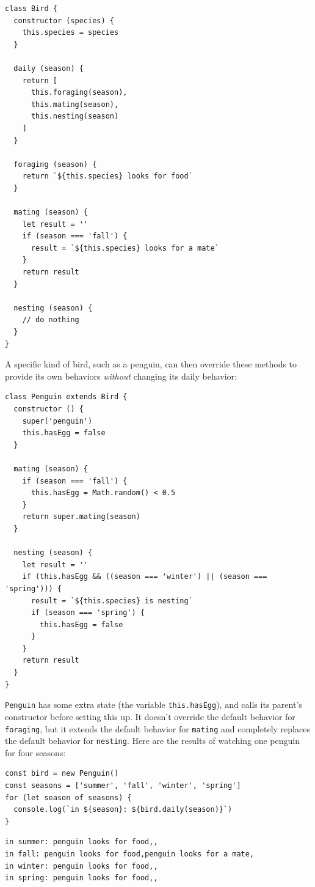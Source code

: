 \begin{verbatim}
class Bird {
  constructor (species) {
    this.species = species
  }

  daily (season) {
    return [
      this.foraging(season),
      this.mating(season),
      this.nesting(season)
    ]
  }

  foraging (season) {
    return `${this.species} looks for food`
  }

  mating (season) {
    let result = ''
    if (season === 'fall') {
      result = `${this.species} looks for a mate`
    }
    return result
  }

  nesting (season) {
    // do nothing
  }
}
\end{verbatim}

A specific kind of bird, such as a penguin, can then override these
methods to provide its own behaviors \emph{without} changing its daily
behavior:

\begin{verbatim}
class Penguin extends Bird {
  constructor () {
    super('penguin')
    this.hasEgg = false
  }

  mating (season) {
    if (season === 'fall') {
      this.hasEgg = Math.random() < 0.5
    }
    return super.mating(season)
  }

  nesting (season) {
    let result = ''
    if (this.hasEgg && ((season === 'winter') || (season === 'spring'))) {
      result = `${this.species} is nesting`
      if (season === 'spring') {
        this.hasEgg = false
      }
    }
    return result
  }
}
\end{verbatim}

\texttt{Penguin} has some extra state (the variable
\texttt{this.hasEgg}), and calls its parent's constructor before setting
this up. It doesn't override the default behavior for \texttt{foraging},
but it extends the default behavior for \texttt{mating} and completely
replaces the default behavior for \texttt{nesting}. Here are the results
of watching one penguin for four seasons:

\begin{verbatim}
const bird = new Penguin()
const seasons = ['summer', 'fall', 'winter', 'spring']
for (let season of seasons) {
  console.log(`in ${season}: ${bird.daily(season)}`)
}
\end{verbatim}

\begin{verbatim}
in summer: penguin looks for food,,
in fall: penguin looks for food,penguin looks for a mate,
in winter: penguin looks for food,,
in spring: penguin looks for food,,
\end{verbatim}

